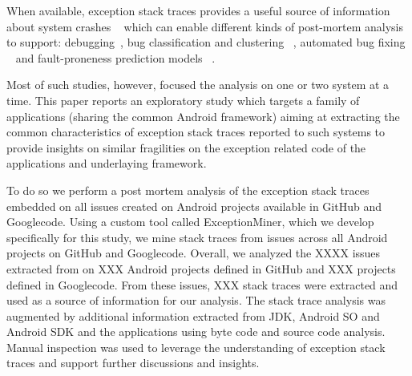 \documentclass[conference]{IEEEtran}
\begin{document}

When available, exception stack traces provides a useful source of information about system crashes ~\cite{bettenburg2008makes} which 
 can enable different kinds of post-mortem analysis to support:  debugging~\cite{schroter2010stack}, 
 bug classification and clustering ~\cite{wang2013improving, kim2011crash, dhaliwal2011classifying},  
automated bug fixing ~\cite{sinha2009fault} and fault-proneness prediction models ~\cite{kim2013predicting}. 

Most of such studies, however, focused the analysis on one or two system at a time.
This paper reports an exploratory study which targets a family of applications 
(sharing the common Android framework) aiming at extracting 
the common characteristics of exception stack traces reported to such systems to provide
insights on similar fragilities on the exception related code of the applications and underlaying framework.

To do so we perform a post mortem analysis of the exception stack traces embedded on all issues
created on Android projects available in GitHub and Googlecode. Using a custom tool called ExceptionMiner,
 which we develop specifically for this study, we mine stack traces from issues across all Android projects on
GitHub and Googlecode. Overall, we analyzed the XXXX issues extracted from on XXX Android projects defined in
GitHub and XXX projects defined in Googlecode. From these issues,  XXX stack traces were extracted and used as
 a source of information for our analysis. The stack trace analysis was augmented by additional information
extracted from JDK, Android SO and Android SDK and the applications using byte code and source code analysis.
 Manual inspection was used to leverage the understanding of exception stack traces and support further discussions and insights.

\end{document}
